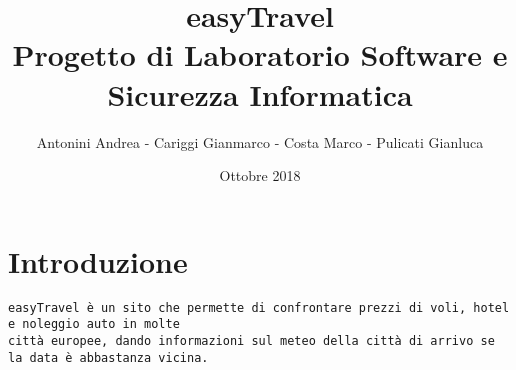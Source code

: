 \documentclass[11pt]{article}
\title{easyTravel \\ \bigskip \large Progetto di Laboratorio Software e Sicurezza Informatica}
\author{Antonini Andrea - Cariggi Gianmarco - Costa Marco - Pulicati Gianluca}
\date{Ottobre 2018}
\begin{document}
\maketitle

\section{Introduzione}

\begin{verbatim}
easyTravel è un sito che permette di confrontare prezzi di voli, hotel e noleggio auto in molte
città europee, dando informazioni sul meteo della città di arrivo se la data è abbastanza vicina.
\end{verbatim}
\end{document}
